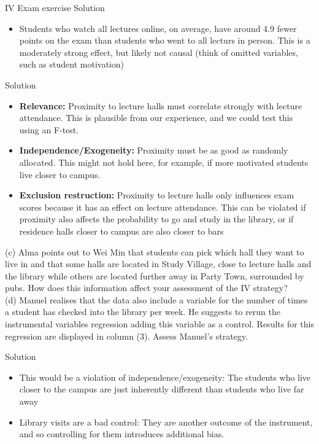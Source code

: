 \documentclass[11pt,xcolor=table]{beamer}
\begin{document}
\begin{frame}[allowframebreaks]{IV Exam exercise}
\alert{Solution}
\begin{itemize}
    \item Students who watch all lectures online, on average, have around 4.9 fewer points on the exam than students who went to all lecturs in person. This is a moderately strong effect, but likely not causal (think of omitted variables, such as student motivation)
\end{itemize}
\framebreak

\alert{Solution}
    \begin{itemize}
    \item \textbf{Relevance:} Proximity to lecture halls must correlate strongly with lecture attendance. This is plausible from our experience, and we could test this using an F-test.
    \item  
    \textbf{Independence/Exogeneity:}  Proximity must be as good as randomly allocated. This might not hold here, for example, if more motivated students live closer to campus.
    \item
    \textbf{Exclusion restruction:} Proximity to lecture halls only influences exam scores because it has an effect on lecture attendance. This can be violated if proximity also affects the probability to go and study in the library, or if residence halls closer to campus are also closer to bars
\end{itemize}

\framebreak
(c) Alma points out to Wei Min that students can pick which hall they want to live in and that some halls are located in Study Village, close to lecture halls and the library while others are located further away in Party Town, surrounded by pubs. How does this information affect your assessment of the IV strategy?\\
(d) Manuel realises that the data also include a variable for the number of times a student has checked into the library per week. He suggests to rerun the instrumental variables regression adding this variable as a control. Results for this regression are displayed in column (3). Assess Manuel’s strategy.

\framebreak 
\alert{Solution}
\begin{itemize}
    \item This would be a violation of independence/exogeneity: The students who live closer to the campus are just inherently different than students who live far away
    \item Library visits are a bad control: They are another outcome of the instrument, and so controlling for them introduces additional bias.
\end{itemize}


\end{frame}
\end{document}
